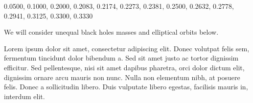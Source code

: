  0.0500, 0.1000, 0.2000, 0.2083, 0.2174, 0.2273, 0.2381, 0.2500, 0.2632, 0.2778, 0.2941, 0.3125, 0.3300, 0.3330 


We will consider
unequal black holes masses and elliptical orbits below.  


Lorem ipsum dolor sit amet, consectetur adipiscing elit. Donec
volutpat felis sem, fermentum tincidunt dolor bibendum a. Sed sit amet
justo ac tortor dignissim efficitur. Sed pellentesque, nisi sit amet
dapibus pharetra, orci dolor dictum elit, dignissim ornare arcu mauris
non nunc. Nulla non elementum nibh, at posuere felis. Donec a
sollicitudin libero. Duis vulputate libero egestas, facilisis mauris
in, interdum elit.

